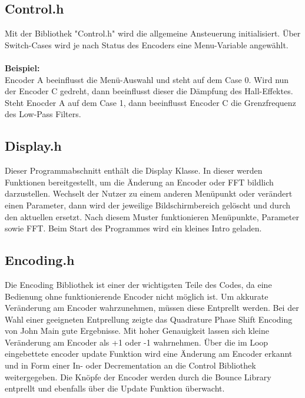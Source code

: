 \documentclass[12pt]{article}
\begin{document}
\subsection{Control.h}
Mit der Bibliothek "Control.h" wird die allgemeine Ansteuerung initialisiert. Über Switch-Cases wird je nach Status des Encoders eine Menu-Variable angewählt. 
\\
\\
\textbf{Beispiel:}
\\
Encoder A beeinflusst die Menü-Auswahl und steht auf dem Case 0. Wird nun der Encoder C gedreht, dann beeinflusst dieser die Dämpfung des Hall-Effektes.
Steht Enocder A auf dem Case 1, dann beeinflusst Encoder C die Grenzfrequenz des Low-Pass Filters.
\subsection{Display.h}
Dieser Programmabschnitt enthält die Display Klasse. In dieser werden Funktionen bereitgestellt, um die Änderung an Encoder oder FFT bildlich darzustellen.  
Wechselt der Nutzer zu einem anderen Menüpunkt oder verändert einen Parameter, dann wird der jeweilige Bildschirmbereich gelöscht und durch den aktuellen ersetzt. 
Nach diesem Muster funktionieren Menüpunkte, Parameter sowie FFT. Beim Start des Programmes wird ein kleines Intro geladen.

\subsection{Encoding.h}
Die Encoding Bibliothek ist einer der wichtigsten Teile des Codes, da eine Bedienung ohne funktionierende Encoder nicht möglich ist. Um akkurate Veränderung am Encoder wahrzunehmen, 
müssen diese Entprellt werden. Bei der Wahl einer geeigneten Entprellung zeigte das Quadrature Phase Shift Encoding von John Main gute Ergebnisse. Mit hoher Genauigkeit lassen sich 
kleine Veränderung am Encoder als +1 oder -1 wahrnehmen. Über die im Loop eingebettete encoder update Funktion wird eine Änderung am Encoder erkannt und in Form einer In- oder Decrementation an die Control 
Bibliothek weitergegeben. Die Knöpfe der Encoder werden durch die Bounce Library entprellt und ebenfalls über die Update Funktion überwacht.   
\end{document}
